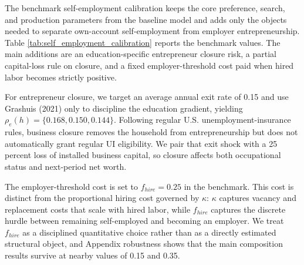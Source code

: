 The benchmark self-employment calibration keeps the core preference, search, and production parameters from the baseline model and adds only the objects needed to separate own-account self-employment from employer entrepreneurship. Table \ref{tab:self_employment_calibration} reports the benchmark values. The main additions are an education-specific entrepreneur closure risk, a partial capital-loss rule on closure, and a fixed employer-threshold cost paid when hired labor becomes strictly positive.



For entrepreneur closure, we target an average annual exit rate of 0.15 and use Grashuis (2021) only to discipline the education gradient, yielding $\rho_e(h)=\{0.168,0.150,0.144\}$. Following regular U.S. unemployment-insurance rules, business closure removes the household from entrepreneurship but does not automatically grant regular UI eligibility. We pair that exit shock with a 25 percent loss of installed business capital, so closure affects both occupational status and next-period net worth.

The employer-threshold cost is set to $f_{hire}=0.25$ in the benchmark. This cost is distinct from the proportional hiring cost governed by $\kappa$: $\kappa$ captures vacancy and replacement costs that scale with hired labor, while $f_{hire}$ captures the discrete hurdle between remaining self-employed and becoming an employer. We treat $f_{hire}$ as a disciplined quantitative choice rather than as a directly estimated structural object, and Appendix robustness shows that the main composition results survive at nearby values of 0.15 and 0.35.
